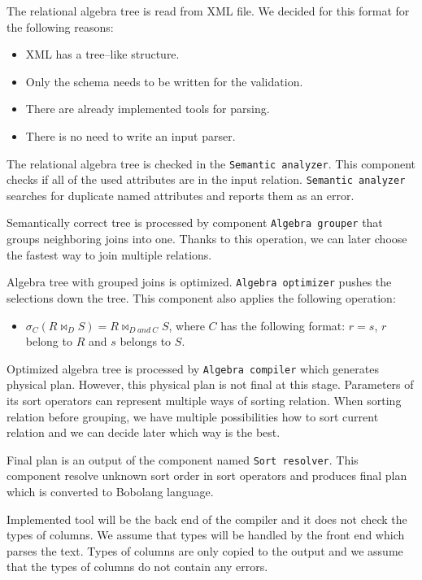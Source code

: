 The relational algebra tree is read from XML file. We decided for this format for the following reasons:
\begin{itemize}
\item XML has a tree--like structure.
\item Only the schema needs to be written for the validation.
\item There are already implemented tools for parsing.
\item There is no need to write an input parser.
\end{itemize}

The relational algebra tree is checked in the \texttt{Semantic analyzer}. This component checks if all of the used attributes are in the input relation. \texttt{Semantic analyzer} searches for duplicate named attributes and reports them as an error. 

Semantically correct tree is processed by component \texttt{Algebra grouper} that groups neighboring joins into one. Thanks to this operation, we can later choose the fastest way to join multiple relations.

Algebra tree with grouped joins is optimized. \texttt{Algebra optimizer} pushes the selections down the tree. This component also applies the following operation:
\begin{itemize}
\item  $\sigma_C(R\Join_D S)= R\Join_{D~and~C} S$, where $C$ has the following format: $r=s$, $r$ belong to $R$ and $s$ belongs to $S$.
\end{itemize}

Optimized algebra tree is processed by \texttt{Algebra compiler} which generates physical plan. However, this physical plan is not final at this stage. Parameters of its sort operators can represent multiple ways of sorting relation. When sorting relation before grouping, we have multiple possibilities how to sort current relation and we can decide later which way is the best.

Final plan is an output of the component named \texttt{Sort resolver}. This component resolve unknown sort order in sort operators and produces final plan which is converted to Bobolang language.

Implemented tool  will be the back end of the compiler and it does not check the types of columns. We assume that types will be handled by the front end which parses the text. Types of columns are only copied to the output and we assume that the types of columns do not contain any errors.

